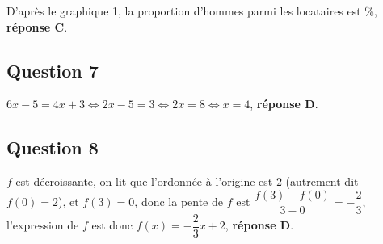 D'après le graphique 1, la proportion d'hommes parmi les locataires est \%, \textbf{réponse C}.

\subsection*{Question 7}



















\mbox{$6x-5=4x+3\iff 2x-5=3\iff2x=8\iff x=4$}, \textbf{réponse D}.
\subsection*{Question 8}



















































$f$ est décroissante, on lit que l'ordonnée à l'origine est $2$ (autrement dit \mbox{$f(0)=2$}), et \mbox{$f(3)=0$}, donc la pente de $f$ est \mbox{$\dfrac{f(3)-f(0)}{3-0}=-\dfrac23$}, l'expression de $f$ est donc \mbox{$f(x)=-\dfrac23 x +2$}, \textbf{réponse D}.
